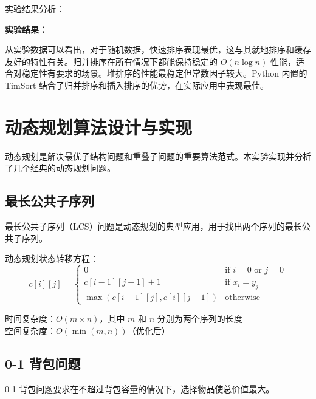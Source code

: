 \documentclass[12pt,a4paper,UTF8]{article}
\newenvironment{algorithm复杂度}{
    \begin{trivlist}\item[\textbf{算法复杂度：}]
}{\end{trivlist}}
\newenvironment{实验结果}{
    \par\noindent\textbf{实验结果：}\par
}{\par\vspace{1em}}
\begin{document}
实验结果分析：
\begin{实验结果}
    从实验数据可以看出，对于随机数据，快速排序表现最优，这与其就地排序和缓存友好的特性有关。归并排序在所有情况下都能保持稳定的 $O(n \log n)$ 性能，适合对稳定性有要求的场景。堆排序的性能最稳定但常数因子较大。Python 内置的 TimSort 结合了归并排序和插入排序的优势，在实际应用中表现最佳。
\end{实验结果}

\section{动态规划算法设计与实现}

动态规划是解决最优子结构问题和重叠子问题的重要算法范式。本实验实现并分析了几个经典的动态规划问题。

\subsection{最长公共子序列}

最长公共子序列（LCS）问题是动态规划的典型应用，用于找出两个序列的最长公共子序列。



动态规划状态转移方程：
\[
c[i][j] = \begin{cases}
0 & \text{if } i = 0 \text{ or } j = 0 \\
c[i-1][j-1] + 1 & \text{if } x_i = y_j \\
\max(c[i-1][j], c[i][j-1]) & \text{otherwise}
\end{cases}
\]

\begin{algorithm复杂度}
    时间复杂度：$O(m \times n)$，其中 $m$ 和 $n$ 分别为两个序列的长度 \\
    空间复杂度：$O(\min(m, n))$（优化后）
\end{algorithm复杂度}

\subsection{0-1 背包问题}

0-1 背包问题要求在不超过背包容量的情况下，选择物品使总价值最大。


\end{document}

